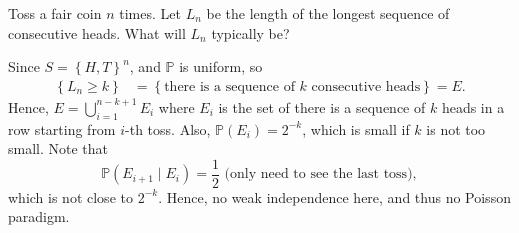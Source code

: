 \begin{eg}
    Toss a fair coin \(n\) times. Let \(L_n\) be the length of the longest sequence of consecutive heads. What will \(L_n\) typically be?   
\end{eg}

\begin{explanation}
    Since \(S = \left\{ H, T \right\}^n \), and \(\mathbb{P} \) is uniform, so 
    \begin{align*}
        \left\{ L_n \ge k \right\} &= \left\{ \text{there is a sequence of } k \text{ consecutive heads}   \right\} = E.  
    \end{align*}  
    Hence, \(E = \bigcup_{i=1}^{n - k + 1} E_i\) where \(E_i\) is the set of there is a sequence of \(k\) heads in a row starting from \(i\)-th toss. Also, \(\mathbb{P} (E_i) = 2^{-k}\), which is small if \(k\) is not too small. Note that 
    \[
        \mathbb{P} (E_{i+1} \mid E_i) = \frac{1}{2} \text{ (only need to see the last toss)}, 
    \]     
    which is not close to \(2^{-k}\). Hence, no weak independence here, and thus no Poisson paradigm.


\end{explanation}
